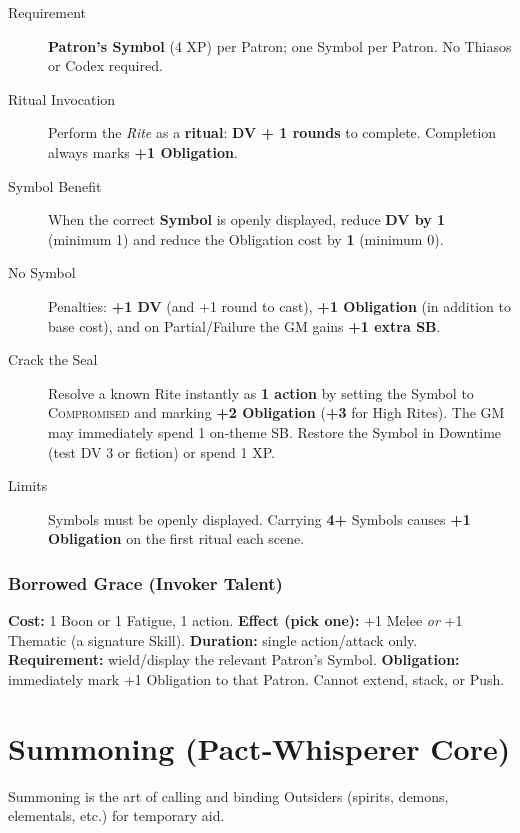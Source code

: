 \begin{description}
    \item[Requirement] \textbf{Patron's Symbol} (4 XP) per Patron; one Symbol per Patron. No Thiasos or Codex required.
    \item[Ritual Invocation] Perform the \emph{Rite} as a \textbf{ritual}: \textbf{DV + 1 rounds} to complete. Completion always marks \textbf{+1 Obligation}.
    \item[Symbol Benefit] When the correct \textbf{Symbol} is openly displayed, reduce \textbf{DV by 1} (minimum 1) and reduce the Obligation cost by \textbf{1} (minimum 0).
    \item[No Symbol] Penalties: \textbf{+1 DV} (and +1 round to cast), \textbf{+1 Obligation} (in addition to base cost), and on Partial/Failure the GM gains \textbf{+1 extra SB}.
    \item[Crack the Seal] Resolve a known Rite instantly as \textbf{1 action} by setting the Symbol to \textsc{Compromised} and marking \textbf{+2 Obligation} (\textbf{+3} for High Rites). The GM may immediately spend 1 on‑theme SB. Restore the Symbol in Downtime (test DV 3 or fiction) or spend 1 XP.
    \item[Limits] Symbols must be openly displayed. Carrying \textbf{4+} Symbols causes \textbf{+1 Obligation} on the first ritual each scene.
\end{description}

\subsubsection*{Borrowed Grace (Invoker Talent)}\label{talent:borrowed_grace}

\textbf{Cost:} 1 Boon or 1 Fatigue, 1 action. \textbf{Effect (pick one):} +1 Melee \emph{or} +1 Thematic (a signature Skill). \textbf{Duration:} single action/attack only. \textbf{Requirement:} wield/display the relevant Patron's Symbol. \textbf{Obligation:} immediately mark +1 Obligation to that Patron. Cannot extend, stack, or Push.

\section{Summoning (Pact‑Whisperer Core)}\label{sec:summoning}

Summoning is the art of calling and binding Outsiders (spirits, demons, elementals, etc.) for temporary aid.

